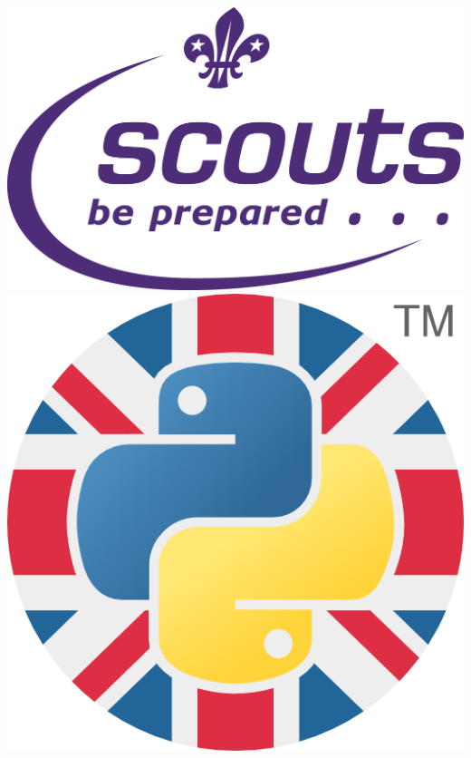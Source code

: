 
\begin{frame}
    \begin{columns}
            \includegraphics[scale=0.4]{images/scouts}
            \includegraphics[scale=0.8]{images/ukpa}
    \end{columns}
\end{frame}

\blankscreen{}

